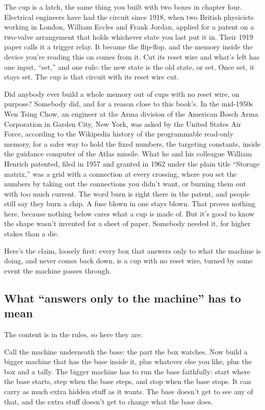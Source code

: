 \documentclass[11pt,twoside]{article}
\theoremstyle{thielethm}
\theoremstyle{thieledef}
\theoremstyle{thieledef}
\theoremstyle{thieledef}
\theoremstyle{thielethm}
\theoremstyle{thieleobs}
\theoremstyle{thielethm}
\begin{document}
The cup is a latch, the same thing you built with two boxes in chapter four. Electrical engineers have had the circuit since 1918, when two British physicists working in London, William Eccles and Frank Jordan, applied for a patent on a two-valve arrangement that holds whichever state you last put it in. Their 1919 paper calls it a trigger relay. It became the flip-flop, and the memory inside the device you're reading this on comes from it. Cut its reset wire and what's left has one input, ``set,'' and one rule: the new state is the old state, or set. Once set, it stays set. The cup is that circuit with its reset wire cut.

Did anybody ever build a whole memory out of cups with no reset wire, on purpose? Somebody did, and for a reason close to this book's. In the mid-1950s Wen Tsing Chow, an engineer at the Arma division of the American Bosch Arma Corporation in Garden City, New York, was asked by the United States Air Force, according to the Wikipedia history of the programmable read-only memory, for a safer way to hold the fixed numbers, the targeting constants, inside the guidance computer of the Atlas missile. What he and his colleague William Henrich patented, filed in 1957 and granted in 1962 under the plain title ``Storage matrix,'' was a grid with a connection at every crossing, where you set the numbers by taking out the connections you didn't want, or burning them out with too much current. The word burn is right there in the patent, and people still say they burn a chip. A fuse blown in one stays blown. That proves nothing here, because nothing below cares what a cup is made of. But it's good to know the shape wasn't invented for a sheet of paper. Somebody needed it, for higher stakes than a die.

Here's the claim, loosely first: every box that answers only to what the machine is doing, and never comes back down, is a cup with no reset wire, turned by some event the machine passes through.

\subsection{What ``answers only to the machine'' has to mean}

The content is in the rules, so here they are.

Call the machine underneath the base: the part the box watches. Now build a bigger machine that has the base inside it, plus whatever else you like, plus the box and a tally. The bigger machine has to run the base faithfully: start where the base starts, step when the base steps, and stop when the base stops. It can carry as much extra hidden stuff as it wants. The base doesn't get to see any of that, and the extra stuff doesn't get to change what the base does.
\end{document}
